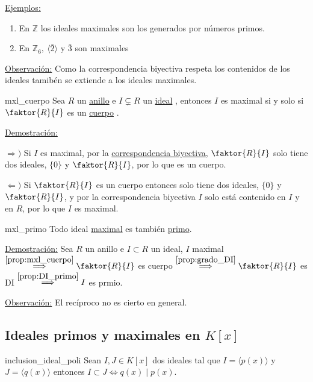 \documentclass[10pt, a4paper]{article}
\newcommand{\Z}{\mathbb{Z}}
\newcommand{\obs}{\underline{Observación:} }
\newcommand{\ejs}{\underline{Ejemplos:} }
\newcommand{\demo}{\underline{Demostración:} }
\newcommand{\anillo}[1][]{\hyperref[def:anillo]{anillo}#1 }
\newcommand{\cuerpo}[1][]{\hyperref[def:cuerpo]{cuerpo}#1 }
\newcommand{\ideal}[1][]{\hyperref[def:ideal]{ideal}#1 }
\newenvironment{enumeratea}{\begin{enumerate}[label=\arabic*)]}
{\end{enumerate}}
\begin{document}
\ejs
\begin{enumeratea}
	\item En $\Z$ los ideales maximales son los generados por números primos.
	\item En $\Z_6,\ \langle \bar{2} \rangle$ y $\bar{3}$ son maximales
\end{enumeratea}

\obs Como la correspondencia biyectiva respeta los contenidos de los ideales tamibén se extiende a los ideales maximales.

\begin{proposition}{}{mxl_cuerpo}
Sea $R$ un \anillo e $I \subsetneq R$ un \ideal, entonces $I$ es maximal si y solo si $\faktor{R}{I}$ es un \cuerpo.
\end{proposition}

\demo 

$\Longrightarrow )$ Si $I$ es maximal, por la \hyperref[theo:corr_biy]{correspondencia biyectiva}, $\faktor{R}{I}$ solo tiene dos ideales, $\{0\}$ y $ \faktor{R}{I}$, por lo que es un cuerpo. 

$\Longleftarrow )$ Si $\faktor{R}{I}$ es un cuerpo entonces solo tiene dos ideales, $\{0\}$ y $\faktor{R}{I}$, y por la correspondencia biyectiva $I$ solo está contenido en $I$ y en $R$, por lo que $I$ es maximal.

\begin{corolary}{}{mxl_primo}
Todo ideal \hyperref[def:ideal_maximal]{maximal} es también \hyperref[def:ideal_primo]{primo}.
\end{corolary}

\demo Sea $R$ un anillo e $I \subset R$ un ideal, $I$ maximal $\overset{\ref{prop:mxl_cuerpo}}{\implies} \faktor{R}{I}$ es cuerpo $\overset{\ref{prop:grado_DI}}{\implies} \faktor{R}{I}$ es DI $\overset{\ref{prop:DI_primo}}{\implies} I$ es prmio.

\vspace{3mm}

\obs El recíproco no es cierto en general.

\vspace{3mm}

\subsection{Ideales primos y maximales en \texorpdfstring{$K[x]$}{TEXT}}

\vspace{3mm}

\begin{proposition}{}{inclusion_ideal_poli}
Sean $I, J \in K[x]$ dos ideales tal que $I = \langle p(x) \rangle$ y $J = \langle q(x) \rangle$ entonces $I \subset J \iff q(x) \mid p(x)$.
\end{proposition}
\end{document}
